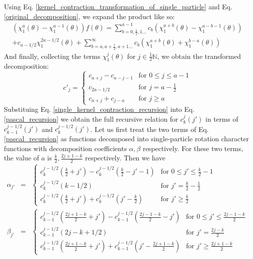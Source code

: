\documentclass[12pt]{article}
\begin{document}
	Using Eq. \ref{kernel_contraction_transformation_of_single_particle} and Eq. \ref{original_decomposition}, we expand the product like so:
	\begin{multline}
	\left(\chi^a_1(\theta)-\chi^{a-1}_1(\theta)\right)f(\theta) = \sum_{b=0, \frac{1}{2}, 1\dots}^{a-1} c_b\left(\chi^{a+b}_1(\theta)-\chi^{a-b-1}_1(\theta)\right)\\
	 + c_{a-1/2}\chi^{2a-1/2}_1(\theta) + \sum_{b=a, a+\frac{1}{2}, a+1\dots}^\infty c_b \left(\chi^{a+b}_1(\theta)+\chi^{b-a}_1(\theta)\right)
	\end{multline}
	And finally, collecting the terms $\chi^j_1(\theta)$ for $j\in\frac{1}{2}\mathbb{N}$, we obtain the transformed decomposition:
	\begin{equation} \label{single_kernel_contraction_recursion}
	c'_j = \begin{cases}
		c_{a+j}-c_{a-j-1} & \text{for } 0 \leq j \leq a - 1\\
		c_{2a-1/2} & \text{for } j = a - \frac{1}{2}\\
		c_{a+j}+c_{j-a} & \text{for } j \geq a
	\end{cases}
	\end{equation}
	Substituing Eq. \ref{single_kernel_contraction_recursion} into Eq. \ref{pascal_recursion} we obtain the full recursive relation for  $c^j_k(j')$ in terms of $c^{j-1/2}_{k-1}(j')$ and $c^{j-1/2}_{k}(j')$. Let us first treat the two terms of Eq. \ref{pascal_recursion} as functions decomposed into single-particle rotation character functions with decomposition coefficients $\alpha, \beta$ respectively. For these two terms, the value of $a$ is $\frac{k}{2},\frac{2j+1-k}{2}$ respectively. Then we have
	\begin{eqnarray*}
	\alpha_{j'} &=& \begin{cases}
		c^{j-1/2}_k\left(\frac{k}{2}+j'\right)-c^{j-1/2}_k\left(\frac{k}{2}-j'-1\right) & \text{for } 0 \leq j' \leq \frac{k}{2} - 1\\
		c^{j-1/2}_k\left(k-1/2\right) & \text{for } j' = \frac{k}{2} - \frac{1}{2}\\
		c^{j-1/2}_k\left(\frac{k}{2}+j'\right)+c^{j-1/2}_k\left(j'-\frac{k}{2}\right) & \text{for } j' \geq \frac{k}{2}
	\end{cases}\\
	\beta_{j'} &=& \begin{cases}
		c^{j-1/2}_{k-1}\left(\frac{2j+1-k}{2}+j'\right)-c^{j-1/2}_{k-1}\left(\frac{2j-1-k}{2}-j'\right) & \text{for } 0 \leq j' \leq \frac{2j-1-k}{2}\\
		c^{j-1/2}_{k-1}\left(2j-k+1/2\right) & \text{for } j' = \frac{2j-k}{2}\\
		c^{j-1/2}_{k-1}\left(\frac{2j+1-k}{2}+j'\right)+c^{j-1/2}_{k-1}\left(j'-\frac{2j+1-k}{2}\right) & \text{for } j' \geq \frac{2j+1-k}{2}
	\end{cases}
	\end{eqnarray*}
\end{document}
